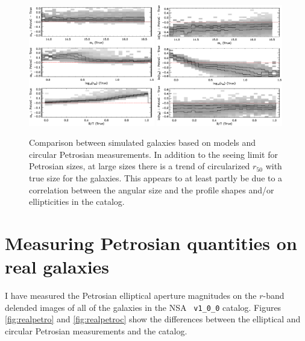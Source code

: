 \documentclass[10pt,preprint]{aastex}
\newcounter{thefigs}
\newcommand{\fignum}{\arabic{thefigs}}
\begin{document}
\begin{figure}
\figurenum{\fignum}
\includegraphics[width=0.49\textwidth]{test-simard-petrocirc-flux-vA.ps} \quad
\includegraphics[width=0.49\textwidth]{test-simard-petrocirc-r50-vA.ps} 
\caption{\label{fig:petroc} Comparison between simulated galaxies based
  on \citet{simard11a} models and circular Petrosian measurements. In
  addition to the seeing limit for Petrosian sizes, at large sizes
  there is a trend of circularized $r_{50}$ with true size for the
  galaxies. This appears to at least partly be due to a correlation
  between the angular size and the profile shapes and/or ellipticities
  in the \citet{simard11a} catalog. }
\end{figure}

\section{Measuring Petrosian quantities on real galaxies} 
\label{sec:real}

I have measured the Petrosian elliptical aperture magnitudes on the
$r$-band delended images of all of the galaxies in the NSA {\tt
  v1\_0\_0} catalog. Figures \ref{fig:realpetro} and
\ref{fig:realpetroc} show the differences between the elliptical and
circular Petrosian measurements and the \citet{simard11a} catalog.
\end{document}
